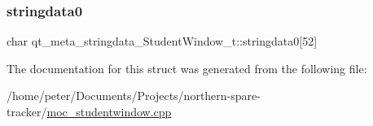 \subsubsection{\texorpdfstring{stringdata0}{stringdata0}}
{\footnotesize\ttfamily char qt\+\_\+meta\+\_\+stringdata\+\_\+\+Student\+Window\+\_\+t\+::stringdata0\mbox{[}52\mbox{]}}



The documentation for this struct was generated from the following file\+:\begin{DoxyCompactItemize}
\item 
/home/peter/\+Documents/\+Projects/northern-\/spare-\/tracker/\hyperlink{moc__studentwindow_8cpp}{moc\+\_\+studentwindow.\+cpp}\end{DoxyCompactItemize}
